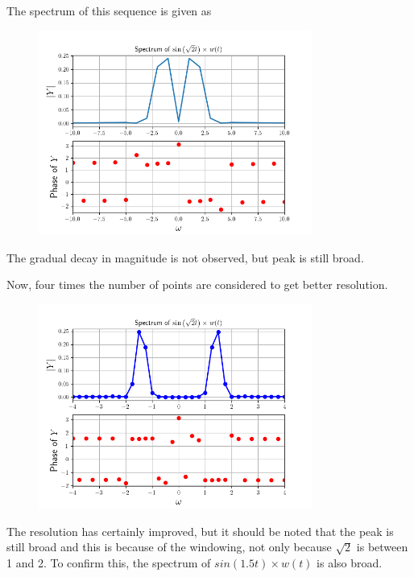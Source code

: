 \documentclass[12pt, a4paper]{article}
\begin{document}
The spectrum of this sequence is given as

\begin{figure}[H]
\centering
\includegraphics[width=0.8\textwidth]{ex6.png}
\end{figure}

The gradual decay in magnitude is not observed, but peak is still broad.

Now, four times the number of points are considered to get better resolution.

\begin{figure}[H]
\centering
\includegraphics[width=0.8\textwidth]{ex7_1.png}
\end{figure}

The resolution has certainly improved, but it should be noted that the peak is still broad and this is because of the windowing, not only because $\sqrt{2}$ is between 1 and 2. To confirm this, the spectrum of $sin(1.5t) \times w(t)$ is also broad.
\end{document}
